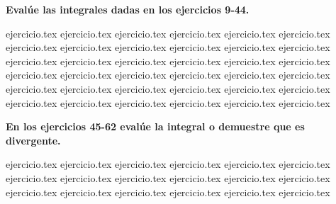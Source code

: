 \vspace{0.5cm}
\noindent\textbf{Evalúe las integrales dadas en los ejercicios 9-44.}
\begin{enumerate}
    \setcounter{enumi}{8}
    {ejercicio.tex}
{ejercicio.tex}
{ejercicio.tex}
{ejercicio.tex}
{ejercicio.tex}
{ejercicio.tex}
{ejercicio.tex}
{ejercicio.tex}
{ejercicio.tex}
{ejercicio.tex}
{ejercicio.tex}
{ejercicio.tex}
{ejercicio.tex}
{ejercicio.tex}
{ejercicio.tex}
{ejercicio.tex}
{ejercicio.tex}
{ejercicio.tex}
{ejercicio.tex}
{ejercicio.tex}
{ejercicio.tex}
{ejercicio.tex}
{ejercicio.tex}
{ejercicio.tex}
{ejercicio.tex}
{ejercicio.tex}
{ejercicio.tex}
{ejercicio.tex}
{ejercicio.tex}
{ejercicio.tex}
{ejercicio.tex}
{ejercicio.tex}
{ejercicio.tex}
{ejercicio.tex}
{ejercicio.tex}
{ejercicio.tex}
\end{enumerate}

\vspace{0.5cm}
\noindent\textbf{En los ejercicios 45-62 evalúe la integral o demuestre que es divergente.}
\begin{enumerate}
    \setcounter{enumi}{44}
    {ejercicio.tex}
{ejercicio.tex}
{ejercicio.tex}
{ejercicio.tex}
{ejercicio.tex}
{ejercicio.tex}
{ejercicio.tex}
{ejercicio.tex}
{ejercicio.tex}
{ejercicio.tex}
{ejercicio.tex}
{ejercicio.tex}
{ejercicio.tex}
{ejercicio.tex}
{ejercicio.tex}
{ejercicio.tex}
{ejercicio.tex}
{ejercicio.tex}
\end{enumerate}

